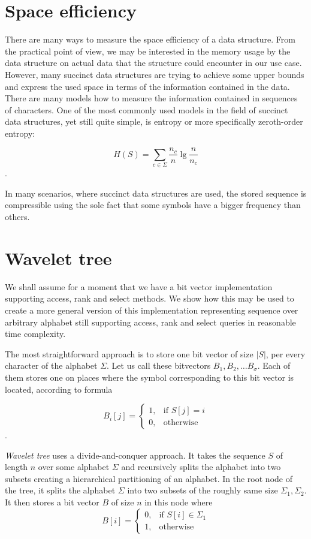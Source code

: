\section{Space efficiency}

There are many ways to measure the space efficiency of a data structure. From the
practical point of view, we may be interested in the memory usage by the data
structure on actual data that the structure could encounter in our use case. However,
many succinct data structures are trying to achieve some upper bounds and express
the used space in terms of the information contained in the data. There are many
models how to measure the information contained in sequences of characters. One
of the most commonly used models in the field of succinct data structures, yet still
quite simple, is entropy or more specifically zeroth-order entropy:

$$H(S)=\sum_{c\in\Sigma} \frac{n_c}{n} \lg \frac{n}{n_c}$$.

In many scenarios, where succinct data structures are used, the stored sequence
is compressible using the sole fact that some symbols have a bigger frequency than others.

\section{Wavelet tree}
\label{section:WaweletTree}

We shall assume for a moment that we have a bit vector implementation supporting
access, rank and select methods. We show how this may be used to create
a more general version of this implementation representing sequence over arbitrary
alphabet still supporting access, rank and select queries in reasonable time complexity.

The most straightforward approach is to store one bit vector of size $|S|$,
per every character of the alphabet $\Sigma$. Let us call these bitvectors $B_1,
B_2, \ldots B_{\sigma}$. Each of them stores one on places where the symbol corresponding
to this bit vector is located, according to formula

\[
    B_i[j]= 
\begin{cases}
	1,& \text{if } S[j]=i \\
    0,& \text{otherwise}
\end{cases}
\].


\textit{Wavelet tree} uses a divide-and-conquer approach. It takes the sequence $S$ of
length $n$ over some alphabet $\Sigma$ and recursively splits the alphabet into
two subsets creating a hierarchical partitioning of an alphabet. In the root node
of the tree, it splits the alphabet $\Sigma$ into two subsets of the roughly same
size $\Sigma_1, \Sigma_2$. It then stores a bit vector $B$ of size $n$ in this node
where
\[
    B[i]= 
\begin{cases}
    0,& \text{if } S[i]\in \Sigma_1\\
    1,              & \text{otherwise}
\end{cases}
\]

